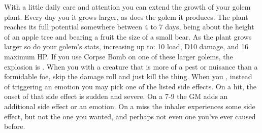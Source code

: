 \documentclass[darkmode]{dw_playbook}
\begin{document}
    {
            {With a little daily care and attention you can extend the growth of your golem plant.  Every day you  it grows larger, as does the golem it produces.  The plant reaches its full potential somewhere between 4 to 7 days, being about the height of an apple tree and bearing a fruit the size of a small bear.
            \gap
            As the plant grows larger so do your golem’s stats, increasing up to: 10 load, D10 damage, and 16 maximum HP.  If you use Corpse Bomb on one of these larger golems, the explosion is .}
            {When you  with a creature that is more of a pest or nuisance than a formidable foe, skip the damage roll and just kill the thing.}
        \gap
            {When you , instead of triggering an emotion you may pick one of the listed side effects.  On a hit, the onset of that side effect is sudden and severe.  On a 7-9 the GM adds an additional side effect or an emotion.  On a miss the inhaler experiences some side effect, but not the one you wanted, and perhaps not even one you’ve ever caused before.}
    }

\clearpage
~
\end{document}
